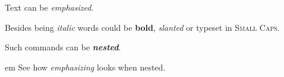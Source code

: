 \documentclass{article}
\begin{document}
{\sffamily

Text can be {\em emphasized}.

Besides being {\itshape italic} words could be {\bfseries bold}, {\slshape slanted} or typeset in {\scshape Small Caps}.

Such commands can be {\itshape\bfseries nested}.}

{em See how {\em emphasizing} looks when nested.}
\end{document}
